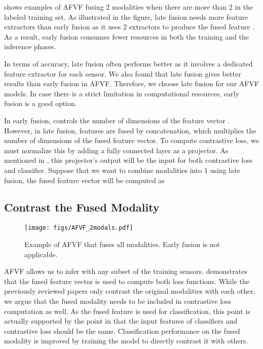 \documentclass[conference]{IEEEtran}
\begin{document}
 shows examples of AFVF fusing 2 modalities when there are more than 2 in the labeled training set. As illustrated in the figure, late fusion needs more feature extractors than early fusion as it uses 2 extractors to produce the fused feature . As a result, early fusion consumes fewer resources in both the training and the inference phases.

In terms of accuracy, late fusion often performs better as it involves a dedicated feature extractor for each sensor. We also found that late fusion gives better results than early fusion in AFVF. Therefore, we choose late fusion for our AFVF models. In case there is a strict limitation in computational resources, early fusion is a good option.

In early fusion,  controls the number of dimensions of the feature vector . However, in late fusion, features are fused by concatenation, which multiplies the number of dimensions of the fused feature vector. To compute contrastive loss, we must normalize this by adding a fully connected layer as a projector. As mentioned in , this projector's output will be the input for both contrastive loss and classifier. Suppose that we want to combine  modalities into 1 using late fusion, the fused feature vector will be computed as


\subsection{Contrast the Fused Modality}
\label{subsec: contrast fused}

\begin{figure}[!t]
\captionsetup{justification=centering}
\centerline{\texttt{[image: figs/AFVF\_2modals.pdf]}}
\caption{Example of AFVF that fuses all modalities. Early fusion is not applicable.}
\label{fig: afvf fuse all}
\end{figure}
AFVF allows us to infer with any subset of the training sensors.  demonstrates that the fused feature vector  is used to compute both loss functions. While the previously reviewed papers only contrast the original modalities with each other, we argue that the fused modality needs to be included in contrastive loss computation as well. As the fused feature is used for classification, this point is actually supported by the point in  that the input features of classifiers and contrastive loss should be the same. Classification performance on the fused modality is improved by training the model to directly contrast it with others.
\end{document}
